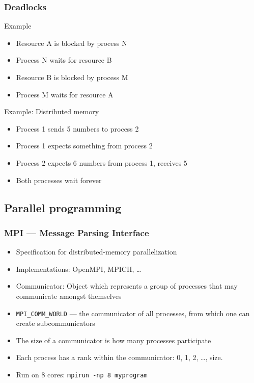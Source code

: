 \documentclass[usenames,dvipsnames,mathserif,compress]{beamer}
\begin{document}
\begin{frame}
  \frametitle{Deadlocks}
  \begin{block}{Example}
  \begin{itemize}
  \item Resource A is blocked by process N
  \item Process N waits for resource B
  \item Resource B is blocked by process M
  \item Process M waits for resource A
  \end{itemize}
  \end{block}

  \begin{block}{Example: Distributed memory}
    \begin{itemize}
    \item Process 1 sends 5 numbers to process 2
    \item Process 1 expects something from process 2
    \item Process 2 expects 6 numbers from process 1, receives 5
    \item Both processes wait forever
    \end{itemize}
  \end{block}
\end{frame}

\subsection*{Parallel programming}

\begin{frame}[fragile]
  \frametitle{MPI --- Message Parsing Interface}
  \begin{itemize}
  \item Specification for distributed-memory parallelization
  \item Implementations: OpenMPI, MPICH, \ldots
  \item \alert{Communicator}: Object which represents a group of processes that may communicate amongst themselves
  \item \verb#MPI_COMM_WORLD# --- the communicator of all processes, from which one can create subcommunicators
  \item The \alert{size} of a communicator is how many processes participate
  \item Each process has a \alert{rank} within the communicator: 0, 1, 2, \ldots, size.
  \item Run on 8 cores: \texttt{mpirun -np 8 myprogram}
  \end{itemize}
\end{frame}
\end{document}
